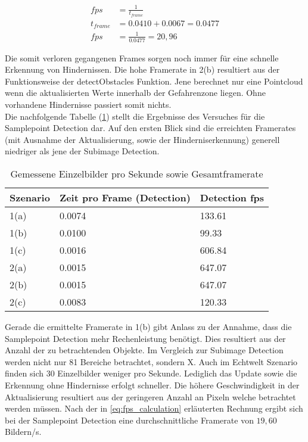 \begin{equation}
\label{eq:fps_calculation}
\begin{aligned}
	fps &= \frac{1}{t_{frame}}\\
	t_{frame} &= 0.0410 + 0.0067 = 0.0477\\
	fps &= \frac{1}{0.0477} = 20,96
\end{aligned}
\end{equation}

\noindent
Die somit verloren gegangenen Frames sorgen noch immer für eine schnelle Erkennung von Hindernissen. Die hohe Framerate in 2(b) resultiert aus der Funktionsweise der detectObstacles Funktion. Jene berechnet nur eine Pointcloud wenn die aktualisierten Werte innerhalb der Gefahrenzone liegen. Ohne vorhandene Hindernisse passiert somit nichts.\\

\noindent
Die nachfolgende Tabelle (\ref{tbl:samplepoint_framerate}) stellt die Ergebnisse des Versuches für die Samplepoint Detection dar. Auf den ersten Blick sind die erreichten Framerates (mit Ausnahme der Aktualisierung, sowie der Hinderniserkennung) generell niedriger als jene der Subimage Detection. 

\begin{table}[h]
\centering
\begin{tabular}{|l|l|l|}
\hline
Szenario & Zeit pro Frame (Detection) & Detection fps \\ \hline\hline
1(a)     & 0.0074           			  & 133.61         \\ \hline
1(b)     & 0.0100           			  & 99.33          \\ \hline
1(c)     & 0.0016           			  & 606.84         \\ \hline\hline
2(a)     & 0.0015           			  & 647.07         \\ \hline
2(b)     & 0.0015           		  	  & 647.07         \\ \hline
2(c)     & 0.0083           	 		  & 120.33         \\ \hline
\end{tabular}
\caption{Gemessene Einzelbilder pro Sekunde sowie Gesamtframerate}
\label{tbl:samplepoint_framerate}
\end{table}

\noindent
Gerade die ermittelte Framerate in 1(b) gibt Anlass zu der Annahme, dass die Samplepoint Detection mehr Rechenleistung benötigt. Dies resultiert aus der Anzahl der zu betrachtenden Objekte. Im Vergleich zur Subimage Detection werden nicht nur 81 Bereiche betrachtet, sondern X. Auch im Echtwelt Szenario finden sich 30 Einzelbilder weniger pro Sekunde. Lediglich das Update sowie die Erkennung ohne Hindernisse erfolgt schneller. Die höhere Geschwindigkeit in der Aktualisierung resultiert aus der geringeren Anzahl an Pixeln welche betrachtet werden müssen. Nach der in \ref{eq:fps_calculation} erläuterten Rechnung ergibt sich bei der Samplepoint Detection eine durchschnittliche Framerate von $19,60$ Bildern/s.

